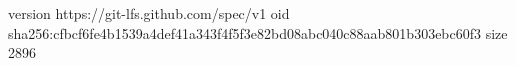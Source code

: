 version https://git-lfs.github.com/spec/v1
oid sha256:cfbcf6fe4b1539a4def41a343f4f5f3e82bd08abc040c88aab801b303ebc60f3
size 2896
